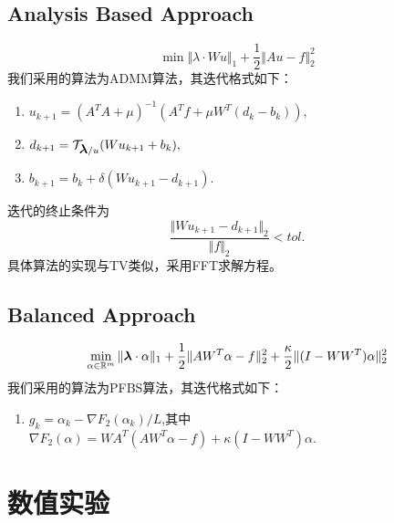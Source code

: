 \documentclass[a4paper,  11pt]{ctexart}
\newcommand{\bm}[1]{\mbox{\boldmath{$#1$}}}
\begin{document}
\subsection{Analysis Based Approach}
\[  
   \min \Vert \lambda \cdot Wu\Vert_1 + \frac 12 \Vert
   Au - f \Vert_2^2
\]
我们采用的算法为ADMM算法，其迭代格式如下：
\begin{enumerate}
    \item $u_{k+1}=(A^TA+\mu)^{-1}(A^Tf+\mu W^T(d_k-b_k)),$
    \item $d_{k+1}=\mathcal{T}_{\bm\lambda/u}(Wu_{k+1}+b_k),$
    \item $b_{k+1}=b_k+\delta(Wu_{k+1}-d_{k+1}).$
\end{enumerate}
迭代的终止条件为
\[
\frac{\Vert Wu_{k+1}-d_{k+1}\Vert_2 }{\Vert f\Vert_2}<tol.
\]
具体算法的实现与TV类似，采用FFT求解方程。
\subsection{Balanced Approach}
\[ 
  \min_{\alpha\in\mathbb{R}^m} \Vert
  \bm\lambda\cdot \alpha\Vert_1 + \frac 12
  \Vert AW^T\alpha-f\Vert_2^2+\frac{\kappa}{2}
  \Vert(I-WW^T)\alpha\Vert_2^2
\]
我们采用的算法为PFBS算法，其迭代格式如下：
\begin{enumerate}
    \item $g_k=\alpha_k-\nabla F_2(\alpha_k)/L$,其中
       $\nabla F_2(\alpha) = WA^T(AW^T\alpha-f)
       +\kappa(I-WW^T)\alpha$.
\end{enumerate}
\section{数值实验}
\end{document}
